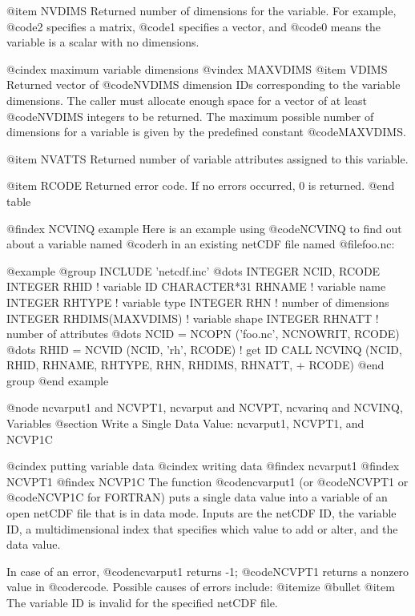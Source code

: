 @item NVDIMS
Returned number of dimensions for the variable.  For example, @code{2}
specifies a matrix, @code{1} specifies a vector, and @code{0} means the
variable is a scalar with no dimensions.

@cindex maximum variable dimensions
@vindex MAXVDIMS
@item VDIMS
Returned vector of @code{NVDIMS} dimension IDs corresponding to the
variable dimensions.  The caller must allocate enough space for a vector
of at least @code{NVDIMS} integers to be returned.  The maximum possible
number of dimensions for a variable is given by the predefined constant
@code{MAXVDIMS}.

@item NVATTS
Returned number of variable attributes assigned to this variable.

@item RCODE
Returned error code.  If no errors occurred, 0 is returned.
@end table

@findex NCVINQ example
Here is an example using @code{NCVINQ} to find out about a variable
named @code{rh} in an existing netCDF file named @file{foo.nc}:

@example
@group
      INCLUDE 'netcdf.inc'
         @dots{}
      INTEGER  NCID, RCODE
      INTEGER  RHID               ! variable ID
      CHARACTER*31 RHNAME         ! variable name
      INTEGER  RHTYPE             ! variable type
      INTEGER  RHN                ! number of dimensions
      INTEGER  RHDIMS(MAXVDIMS)   ! variable shape
      INTEGER  RHNATT             ! number of attributes
         @dots{}
      NCID = NCOPN ('foo.nc', NCNOWRIT, RCODE)
         @dots{}
      RHID = NCVID (NCID, 'rh', RCODE)  ! get ID
      CALL NCVINQ (NCID, RHID, RHNAME, RHTYPE, RHN, RHDIMS, RHNATT,
     +             RCODE)
@end group
@end example

@node ncvarput1 and NCVPT1, ncvarput and NCVPT, ncvarinq and NCVINQ, Variables
@section Write a Single Data Value:  ncvarput1, NCVPT1, and NCVP1C

@cindex putting variable data
@cindex writing data
@findex ncvarput1
@findex NCVPT1
@findex NCVP1C
The function @code{ncvarput1} (or @code{NCVPT1} or @code{NCVP1C} for
FORTRAN) puts a single data value into a variable of an open netCDF file
that is in data mode.  Inputs are the netCDF ID, the variable ID, a
multidimensional index that specifies which value to add or alter, and
the data value.

In case of an error, @code{ncvarput1} returns -1; @code{NCVPT1} returns a
nonzero value in @code{rcode}.  Possible causes of errors include:
@itemize @bullet
@item
The variable ID is invalid for the specified netCDF file.


